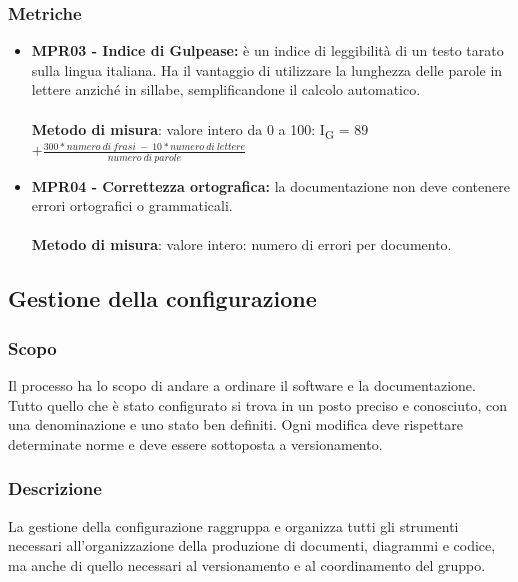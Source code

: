 \subsubsection{Metriche}
\begin{itemize}
    \item \textbf{MPR03 - Indice di Gulpease:}  è un indice di leggibilità di un testo tarato sulla lingua italiana. Ha il vantaggio di utilizzare la lunghezza delle parole in lettere anziché in sillabe, semplificandone il calcolo automatico.\\
          \\\textbf{Metodo di misura}: valore intero da 0 a 100: I\textsubscript{G} = 89 $+ \frac{300*numero \ di \ frasi \ - \ 10*numero \ di \ lettere}{numero \ di \ parole}$
    \item \textbf{MPR04 - Correttezza ortografica:}  la documentazione non deve contenere errori ortografici o grammaticali.\\
          \\\textbf{Metodo di misura}: valore intero: numero di errori per documento.
\end{itemize}
\subsection{Gestione della configurazione}
\subsubsection{Scopo}
Il processo ha lo scopo di andare a ordinare il software e la documentazione. Tutto quello che è stato configurato si trova in un posto preciso e conosciuto, con una denominazione e uno stato ben definiti. Ogni modifica deve rispettare determinate norme e deve essere sottoposta a versionamento.
\subsubsection{Descrizione}
La gestione della configurazione raggruppa e organizza tutti gli strumenti necessari all'organizzazione della produzione di documenti, diagrammi e codice, ma anche di quello necessari al versionamento e al coordinamento del gruppo.
